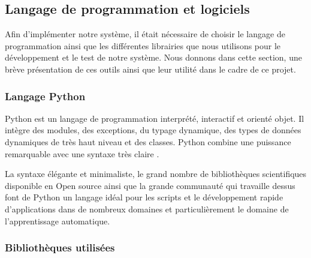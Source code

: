 \subsection{Langage de programmation et logiciels}
Afin d'implémenter notre système, il était nécessaire de choisir le langage de programmation ainsi que les différentes librairies que nous utilisons pour le développement et le test de notre système. Nous donnons dans cette section, une brève présentation de ces outils ainsi que leur utilité dans le cadre de ce projet. 

\subsubsection{Langage Python}
Python est un langage de programmation interprété, interactif et orienté objet. Il intègre des modules, des exceptions, du typage dynamique, des types de données dynamiques de très haut niveau et des classes. Python combine une puissance remarquable avec une syntaxe très claire \cite{python_lang}.

La syntaxe élégante et minimaliste, le grand nombre de bibliothèques scientifiques disponible en Open source ainsi que la grande communauté qui travaille dessus font de Python un langage idéal pour les scripts et le développement rapide d’applications dans de nombreux domaines et particulièrement le domaine de l'apprentissage automatique.

\subsubsection{Bibliothèques utilisées}

